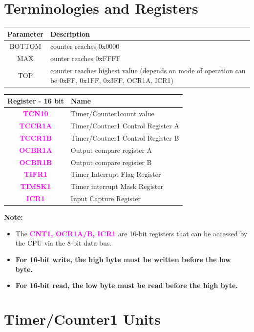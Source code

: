 \documentclass{article}
\newcommand{\regFormat}[1]{\textbf{\textcolor{magenta}{#1}}}
\begin{document}
\section{Terminologies and Registers}
\begin{minipage}{0.4\textwidth}
    \begin{tabular}{c|p{4.5cm}}
        \textbf{Parameter} & \textbf{Description}\\
        \hline
        BOTTOM & counter reaches 0x0000\\
        MAX & ounter reaches 0xFFFF\\
        TOP & counter reaches highest value (depends on mode of operation can be 0xFF, 0x1FF, 0x3FF, OCR1A, ICR1)
    \end{tabular}
\end{minipage}
\begin{minipage}{0.55\textwidth}
    \begin{tabular}{c|p{5.5cm}}
        \textbf{Register - 16 bit} & \textbf{Name}\\
        \hline
        \regFormat{TCN10} & Timer/Counter1count value\\
        \regFormat{TCCR1A} & Timer/Coutner1 Control Register A\\
        \regFormat{TCCR1B} & Timer/Coutner1 Control Register B\\
        \regFormat{OCBR1A} & Output compare register A\\
        \regFormat{OCBR1B} & Output compare register B\\
        \regFormat{TIFR1} & Timer Interrupt Flag Register\\
        \regFormat{TIMSK1} & Timer interrupt Mask Register\\
        \regFormat{ICR1} & Input Capture Register\\
    \end{tabular}
\end{minipage}

\textbf{Note: } 
\begin{itemize}
    \item The \regFormat{CNT1, OCR1A/B, ICR1} are 16-bit registers that can be accessed by the CPU via the 8-bit data bus.
    \item \textbf{For 16-bit write, the high byte must be written before the low byte.}
    \item \textbf{For 16-bit read, the low byte must be read before the high byte.}
\end{itemize}
\section{Timer/Counter1 Units}
\end{document}
